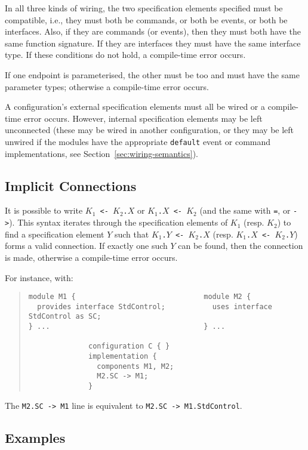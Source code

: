 \documentclass[11pt,letterpaper]{article}
\newcommand{\kw}[1]{{\tt #1}}
\newcommand{\code}[1]{{\tt #1}}
\begin{document}
In all three kinds of wiring, the two specification elements specified must
be compatible, i.e., they must both be commands, or both be events, or both
be interfaces. Also, if they are commands (or events), then they
must both have the same function signature. If they are interfaces
they must have the same interface type. If these conditions do not hold,
a compile-time error occurs.

If one endpoint is parameterised, the other must be too and must have the
same parameter types; otherwise a compile-time error occurs.

A configuration's external specification elements must all be wired or
a compile-time error occurs. However, internal specification elements
may be left unconnected (these may be wired in another configuration,
or they may be left unwired if the modules have the appropriate
\kw{default} event or command implementations, see
Section~\ref{sec:wiring-semantics}).

\subsection{Implicit Connections}
\label{sec:implicit}

It is possible to write \code{$K_1$ <- $K_2$.$X$} or \code{$K_1$.$X$ <-
$K_2$} (and the same with \kw{=}, or \kw{->}). This syntax iterates through
the specification elements of $K_1$ (resp. $K_2$) to find a specification
element $Y$ such that \code{$K_1$.$Y$ <- $K_2$.$X$} (resp. \code{$K_1$.$X$
<- $K_2$.$Y$}) forms a valid connection. If exactly one such $Y$ can
be found, then the connection is made, otherwise a compile-time error
occurs.

For instance, with:
\begin{quote} \begin{verbatim}
module M1 {                              module M2 {
  provides interface StdControl;           uses interface StdControl as SC;
} ...                                    } ...

              configuration C { }
              implementation {
                components M1, M2;
                M2.SC -> M1;
              }
\end{verbatim} \end{quote}
The \code{M2.SC -> M1} line is equivalent to \code{M2.SC -> M1.StdControl}.

\subsection{Examples}
\end{document}
